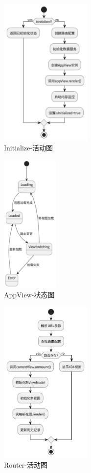 \documentclass{base}
\numberwithin{figure}{section} %
\begin{document}
\begin{figure}[H]
    \centering
    \includegraphics[width=0.4\textwidth]{images/5-8.png}
    \caption{Initialize-活动图}
\end{figure}
\begin{figure}[H]
    \centering
    \includegraphics[width=0.25\textwidth]{images/5-9.png}
    \caption{AppView-状态图}
\end{figure}
\begin{figure}[H]
    \centering
    \includegraphics[width=0.4\textwidth]{images/5-10.png}
    \caption{Router-活动图}
\end{figure}
\end{document}

